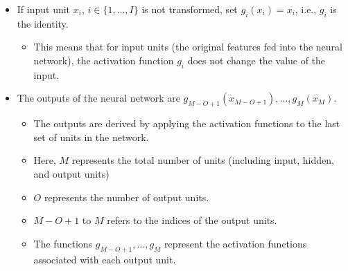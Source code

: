 \begin{definition}
    \begin{itemize}
        \item If input unit $x_i$, $i \in \{1, \ldots, I\}$ is not transformed, set $g_i(x_i) = x_i$, i.e., $g_i$ is the identity.
        \begin{itemize}
            \item This means that for input units (the original features fed into the neural network), the activation function $g_i$ does not change the value of the input. 
        \end{itemize}
        \item The outputs of the neural network are $g_{M-O+1}(x_{M-O+1}), \ldots, g_M(x_M)$.
        \begin{itemize}
            \item The outputs are derived by applying the activation functions to the last set of units in the network.
            \item Here, $M$ represents the total number of units (including input, hidden, and output units)
            \item $O$ represents the number of output units. 
            \item $M-O+1$ to $M$ refers to the indices of the output units.
            \item The functions $g_{M-O+1}, \ldots, g_M$ represent the activation functions associated with each output unit. 
        \end{itemize}
    \end{itemize}    
\end{definition}

